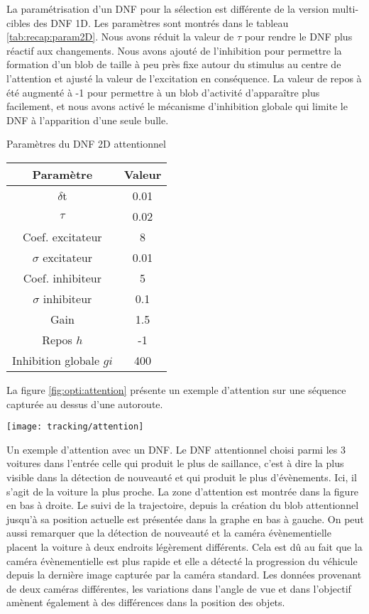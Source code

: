	La paramétrisation d'un DNF pour la sélection est différente de la version multi-cibles des DNF 1D. Les paramètres sont montrés dans le tableau \ref{tab:recap:param2D}. Nous avons réduit la valeur de $\tau$ pour rendre le DNF plus réactif aux changements. Nous avons ajouté de l'inhibition pour permettre la formation d'un blob de taille à peu près fixe autour du stimulus au centre de l'attention et ajusté la valeur de l'excitation en conséquence. La valeur de repos à été augmenté à -1 pour permettre à un blob d'activité d'apparaître plus facilement, et nous avons activé le mécanisme d'inhibition globale qui limite le DNF à l'apparition d'une seule bulle.

	\begin{tableth}
	\caption{Paramètres du DNF 2D attentionnel}
	\begin{tabular}{|c|c|}
		\hline
		Paramètre & Valeur\\
		\hline
		$\delta$t & 0.01 \\
		$\tau$ & 0.02 \\
		Coef. excitateur & 8 \\
		$\sigma$ excitateur & 0.01 \\
		Coef. inhibiteur & 5 \\
		$\sigma$ inhibiteur & 0.1 \\
		Gain & 1.5 \\
		Repos $h$ & -1 \\
		Inhibition globale $gi$ & 400 \\
		\hline
	\end{tabular}
	\label{tab:recap:param2D}
	\end{tableth}

	La figure \ref{fig:opti:attention} présente un exemple d'attention sur une séquence capturée au dessus d'une autoroute.

	\begin{figureth}
		\begin{subfigureth}{\textwidth}
			\texttt{[image: tracking/attention]}
		\end{subfigureth}
		\caption[Exemple d'Attention avec DNF]{Un exemple d'attention avec un DNF. Le DNF attentionnel choisi parmi les 3 voitures dans l'entrée celle qui produit le plus de saillance, c'est à dire la plus visible dans la détection de nouveauté et qui produit le plus d'évènements. Ici, il s'agit de la voiture la plus proche. La zone d'attention est montrée dans la figure en bas à droite. Le suivi de la trajectoire, depuis la création du blob attentionnel jusqu'à sa position actuelle est présentée dans la graphe en bas à gauche. On peut aussi remarquer que la détection de nouveauté et la caméra évènementielle placent la voiture à deux endroits légèrement différents. Cela est dû au fait que la caméra évènementielle est plus rapide et elle a détecté la progression du véhicule depuis la dernière image capturée par la caméra standard. Les données provenant de deux caméras différentes, les variations dans l'angle de vue et dans l'objectif amènent également à des différences dans la position des objets.}\label{fig:opti:attention}
	\end{figureth}

